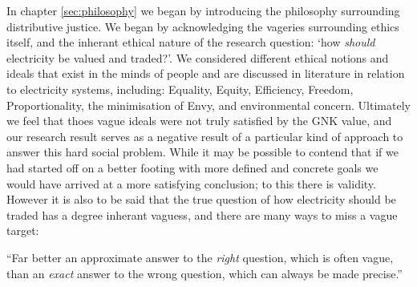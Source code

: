 In chapter \ref{sec:philosophy} we began by introducing the philosophy surrounding distributive justice. We began by acknowledging the vageries surrounding ethics itself, and the inherant ethical nature of the research question: `how \textit{should} electricity be valued and traded?'.
We considered different ethical notions and ideals that exist in the minds of people and are discussed in literature in relation to electricity systems, including: Equality, Equity, Efficiency, Freedom, Proportionality, the minimisation of Envy, and environmental concern.
Ultimately we feel that thoes vague ideals were not truly satisfied by the GNK value, and our research result serves as a negative result of a particular kind of approach to answer this hard social problem.
While it may be possible to contend that if we had started off on a better footing with more defined and concrete goals we would have arrived at a more satisfying conclusion; to this there is validity.
However it is also to be said that the true question of how electricity should be traded has a degree inherant vaguess, and there are many ways to miss a vague target:

\begin{displayquote}
``Far better an approximate answer to the \textit{right} question, which is often vague, than an \textit{exact} answer to the wrong question, which can always be made precise.'' \cite{10.2307/2237638}
\end{displayquote}












